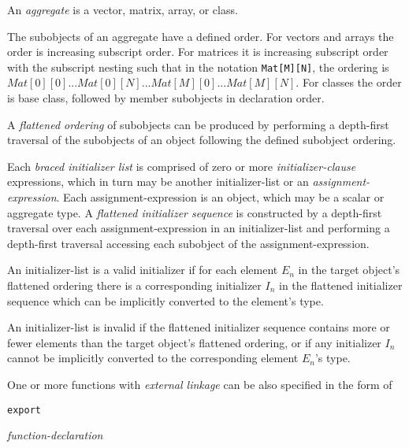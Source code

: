 
\p An \textit{aggregate} is a vector, matrix, array, or class.

\p The subobjects of an aggregate have a defined order. For vectors and arrays
the order is increasing subscript order. For matrices it is increasing subscript
order with the subscript nesting such that in the notation
\texttt{Mat[M][N]}, the ordering is \(Mat[0][0]...Mat[0][N]...
Mat[M][0]...Mat[M][N]\). For classes the order is base class, followed by member
subobjects in declaration order.

\p A \textit{flattened ordering} of subobjects can be produced by performing a
depth-first traversal of the subobjects of an object following the defined
subobject ordering.

\p Each \textit{braced initializer list} is comprised of zero or more
\textit{initializer-clause} expressions, which in turn may be another
initializer-list or an \textit{assignment-expression}. Each
assignment-expression is an object, which may be a scalar or aggregate type. A
\textit{flattened initializer sequence} is constructed by a depth-first
traversal over each assignment-expression in an initializer-list and performing
a depth-first traversal accessing each subobject of the assignment-expression.

\p An initializer-list is a valid initializer if for each element \(E_n\) in the
target object's flattened ordering there is a corresponding initializer \(I_n\)
in the flattened initializer sequence which can be implicitly converted to the
element's type.

\p An initializer-list is invalid if the flattened initializer sequence contains
more or fewer elements than the target object's flattened ordering, or if any
initializer \(I_n\) cannot be implicitly converted to the corresponding element
\(E_n\)'s type.



\p One or more functions with \textit{external linkage} can be also specified in the form of

\begin{grammar}
  \br
  \texttt{export} \terminal{\{}  \terminal{\}}\br

  \br
  \textit{function-declaration} 
\end{grammar}

